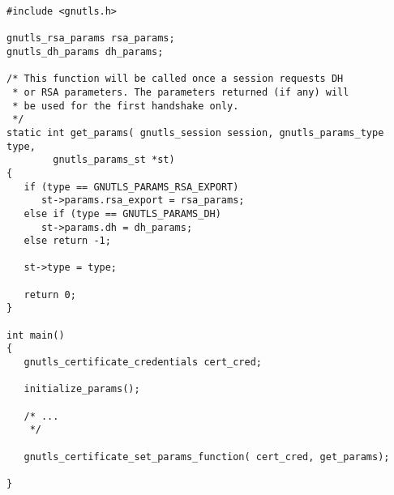 \begin{verbatim}
#include <gnutls.h>

gnutls_rsa_params rsa_params;
gnutls_dh_params dh_params;

/* This function will be called once a session requests DH
 * or RSA parameters. The parameters returned (if any) will
 * be used for the first handshake only.
 */
static int get_params( gnutls_session session, gnutls_params_type type,
        gnutls_params_st *st)
{
   if (type == GNUTLS_PARAMS_RSA_EXPORT)
      st->params.rsa_export = rsa_params;
   else if (type == GNUTLS_PARAMS_DH)
      st->params.dh = dh_params;
   else return -1;

   st->type = type;

   return 0;
}

int main()
{
   gnutls_certificate_credentials cert_cred;

   initialize_params();

   /* ...
    */

   gnutls_certificate_set_params_function( cert_cred, get_params);

}
\end{verbatim}
